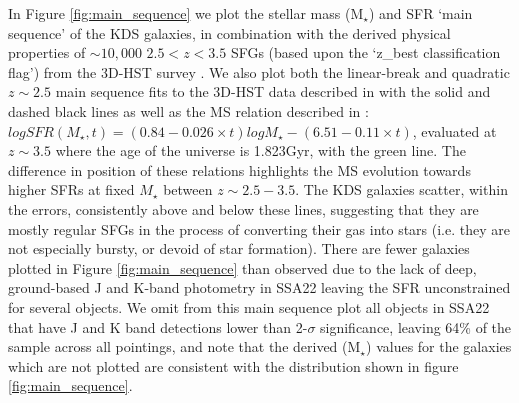 \documentclass[fleqn,usenatbib]{mn2e}
\begin{document}
In Figure \ref{fig:main_sequence} we plot the stellar mass (M$_{\star}$) and SFR `main sequence' of the KDS galaxies, in combination with the derived physical properties of $\sim 10,000$ $2.5 < z < 3.5$ SFGs (based upon the `z\_best classification flag') from the 3D-HST survey \citep{Brammer2012,Momcheva2016}.
We also plot both the linear-break and quadratic $z\sim 2.5$ main sequence fits to the 3D-HST data described in \cite{Whitaker2014} with the solid and dashed black lines as well as the MS relation described in \cite{Speagle2014}: $logSFR(M_{\star}, t) = (0.84 - 0.026 \times t)logM_{\star} - (6.51 - 0.11 \times t)$, evaluated at $z\sim3.5$ where the age of the universe is 1.823Gyr, with the green line.
The difference in position of these relations highlights the MS evolution towards higher SFRs at fixed $M_{\star}$ between $z\sim2.5-3.5$.
The KDS galaxies scatter, within the errors, consistently above and below these lines, suggesting that they are mostly regular SFGs in the process of converting their gas into stars (i.e. they are not especially bursty, or devoid of star formation).
There are fewer galaxies plotted in Figure \ref{fig:main_sequence} than observed due to the lack of deep, ground-based J and K-band photometry in SSA22 leaving the SFR unconstrained for several objects.
We omit from this main sequence plot all objects in SSA22 that have J and K band detections lower than 2-$\sigma$ significance, leaving 64\% of the sample across all pointings, and note that the derived (M$_{\star}$) values for the galaxies which are not plotted are consistent with the distribution shown in figure \ref{fig:main_sequence}.
\end{document}
